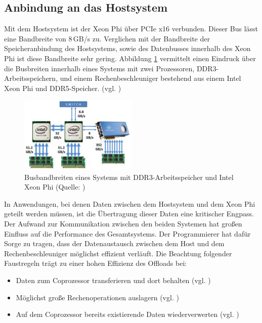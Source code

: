 \documentclass[../main.tex]{subfiles}
\begin{document}
\subsection{Anbindung an das Hostsystem}
Mit dem Hostsystem ist der Xeon Phi über PCIe x16 verbunden. Dieser Bus lässt eine Bandbreite von 8\,GB/s zu. Verglichen mit der Bandbreite der Speicheranbindung des Hostsystems, sowie des Datenbusses innerhalb des Xeon Phi ist diese Bandbreite sehr gering. Abbildung \ref{pic:xeonphiBandwidths} vermittelt einen Eindruck über die Busbreiten innerhalb eines Systems mit zwei Prozessoren, DDR3-Arbeitsspeichern, und einem Rechenbeschleuniger bestehend aus einem Intel Xeon Phi und DDR5-Speicher. (vgl. \cite{interDeviceCommunication})
\begin{figure}
    \centering 
       \includegraphics[width=0.5\textwidth]{../images/Schmidt/xeonphi_bandwidths.jpg} 
    \caption {Busbandbreiten eines Systems mit DDR3-Arbeitsspeicher und Intel Xeon Phi (Quelle: \parencite{interDeviceCommunication})}
    \label{pic:xeonphiBandwidths} 
\end{figure}
In Anwendungen, bei denen Daten zwischen dem Hostsystem und dem Xeon Phi geteilt werden müssen, ist die Übertragung dieser Daten eine kritischer Engpass. Der Aufwand zur Kommunikation zwischen den beiden Systemen hat großen Einfluss auf die Performance des Gesamtsystems. Der Programmierer hat dafür Sorge zu tragen, dass der Datenaustausch zwischen dem Host und dem Rechenbeschleuniger möglichst effizient verläuft. Die Beachtung folgender Faustregeln trägt zu einer hohen Effizienz des Offloads bei: 
\begin{itemize}
\item Daten zum Coprozessor transferieren und dort behalten (vgl. \cite{xeonphiJumpstart})
\item Möglichst große Rechenoperationen auslagern (vgl. \cite{xeonphiJumpstart})
\item Auf dem Coprozessor bereits existierende Daten wiederverwerten (vgl. \cite{xeonphiJumpstart})
\end{itemize}
\end{document}
